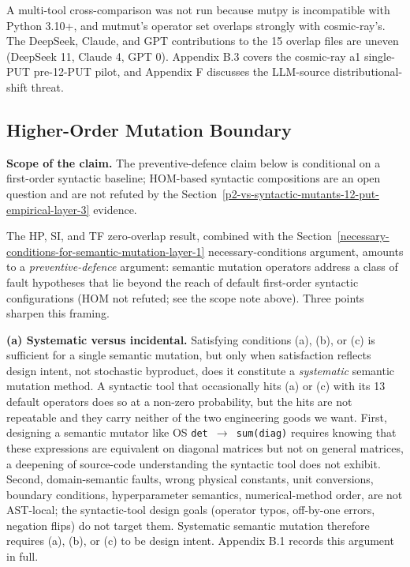 \documentclass[manuscript,screen,review]{acmart}
\begin{document}
A multi-tool cross-comparison was not run because mutpy is incompatible
with Python 3.10+, and mutmut's operator set overlaps strongly with
cosmic-ray's. The DeepSeek, Claude, and GPT contributions to the 15
overlap files are uneven (DeepSeek 11, Claude 4, GPT 0). Appendix B.3
covers the cosmic-ray a1 single-PUT pre-12-PUT pilot, and Appendix F
discusses the LLM-source distributional-shift threat.

\subsection{Higher-Order Mutation Boundary}\label{preventive-defence-framing}

\textbf{Scope of the claim.} The preventive-defence claim below is
conditional on a first-order syntactic baseline; HOM-based syntactic
compositions are an open question and are not refuted by the Section~\ref{p2-vs-syntactic-mutants-12-put-empirical-layer-3}
evidence.

The HP, SI, and TF zero-overlap result, combined with the Section~\ref{necessary-conditions-for-semantic-mutation-layer-1}
necessary-conditions argument, amounts to a \emph{preventive-defence}
argument: semantic mutation operators address a class of fault
hypotheses that lie beyond the reach of default first-order syntactic
configurations (HOM not refuted; see the scope note above). Three points sharpen
this framing.

\textbf{(a) Systematic versus incidental.} Satisfying conditions (a),
(b), or (c) is sufficient for a single semantic mutation, but only when
satisfaction reflects design intent, not stochastic byproduct, does it
constitute a \emph{systematic} semantic mutation method. A syntactic
tool that occasionally hits (a) or (c) with its 13 default operators
does so at a non-zero probability, but the hits are not repeatable and
they carry neither of the two engineering goods we want. First,
designing a semantic mutator like OS \texttt{det\ $\to$\ sum(diag)} requires
knowing that these expressions are equivalent on diagonal matrices but
not on general matrices, a deepening of source-code understanding the
syntactic tool does not exhibit. Second, domain-semantic faults, wrong
physical constants, unit conversions, boundary conditions,
hyperparameter semantics, numerical-method order, are not AST-local; the
syntactic-tool design goals (operator typos, off-by-one errors, negation
flips) do not target them. Systematic semantic mutation therefore
requires (a), (b), or (c) to be design intent. Appendix B.1 records
this argument in full.
\end{document}
